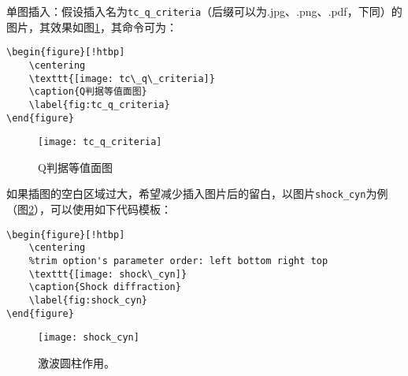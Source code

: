 单图插入：假设插入名为\verb|tc_q_criteria|（后缀可以为.jpg、.png、.pdf，下同）的图片，其效果如图\ref{fig:tc_q_criteria}，其命令可为：
\begin{verbatim}
\begin{figure}[!htbp]
    \centering
    \texttt{[image: tc\_q\_criteria]}
    \caption{Q判据等值面图}
    \label{fig:tc_q_criteria}
\end{figure}
\end{verbatim}
\begin{figure}[!htbp]
    \centering
    \texttt{[image: tc\_q\_criteria]}
    \caption{Q判据等值面图}
    \label{fig:tc_q_criteria}
\end{figure}

如果插图的空白区域过大，希望减少插入图片后的留白，以图片\verb|shock_cyn|为例（图\ref{fig:shock_cyn}），可以使用如下代码模板：
\begin{verbatim}
\begin{figure}[!htbp]
    \centering
    %trim option's parameter order: left bottom right top
    \texttt{[image: shock\_cyn]}
    \caption{Shock diffraction}
    \label{fig:shock_cyn}
\end{figure}
\end{verbatim}
\begin{figure}[!htbp]
    \centering
    \texttt{[image: shock\_cyn]}
    \caption{激波圆柱作用。}
    \label{fig:shock_cyn}
\end{figure}


